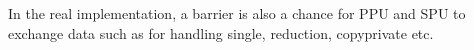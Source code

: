 In the real implementation, a barrier is also a chance for PPU and SPU to 
exchange data such as for handling single, reduction, copyprivate etc. 

%
%

